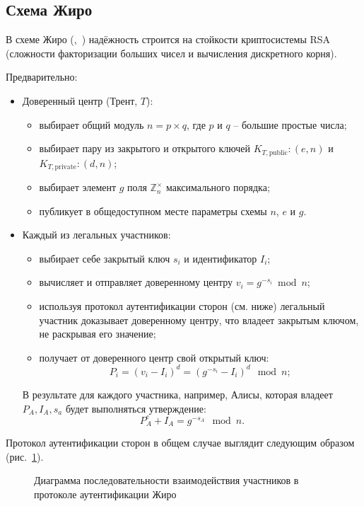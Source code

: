 \subsection{Схема Жиро}\label{section-girault-scheme}

В схеме Жиро (,~\cite{Girault:1990, Girault:1991}) надёжность строится на стойкости криптосистемы RSA (сложности факторизации больших чисел и вычисления дискретного корня).

Предварительно:
\begin{itemize}
    \item Доверенный центр (Трент, $T$):
    \begin{itemize}
        \item выбирает общий модуль $n = p \times q$, где $p$ и $q$ -- большие простые числа;
        \item выбирает пару из закрытого и открытого ключей $K_{T, \text{public}}: (e, n)$ и $K_{T, \text{private}}: (d, n)$;
        \item выбирает элемент $g$ поля $\mathbb{Z}_n^{\times}$ максимального порядка;
        \item публикует в общедоступном месте параметры схемы $n$, $e$ и $g$.
    \end{itemize}
    \item Каждый из легальных участников:
    \begin{itemize}
        \item выбирает себе закрытый ключ $s_i$ и идентификатор $I_i$;
        \item вычисляет и отправляет доверенному центру $v_i = g^{-s_i} \bmod n$;
        \item используя протокол аутентификации сторон (см. ниже) легальный участник доказывает доверенному центру, что владеет закрытым ключом, не раскрывая его значение;
        \item получает от доверенного центр свой открытый ключ:
            \[ P_i = (v_i - I_i)^d = (g^{-s_i} - I_i)^d \mod n; \]
    \end{itemize}
    В результате для каждого участника, например, Алисы, которая владеет $P_A, I_A, s_a$ будет выполняться утверждение:
        \[ P_A^e + I_A = g^{-s_A} \mod n. \]
\end{itemize}

Протокол аутентификации сторон в общем случае выглядит следующим образом (рис.~\ref{fig:key_distribution-girault-auth}).

\begin{figure}
	\centering
	\begin{sequencediagram}

	\end{sequencediagram}
	\caption{Диаграмма последовательности взаимодействия участников в протоколе аутентификации Жиро\label{fig:key_distribution-girault-auth}}
\end{figure}


